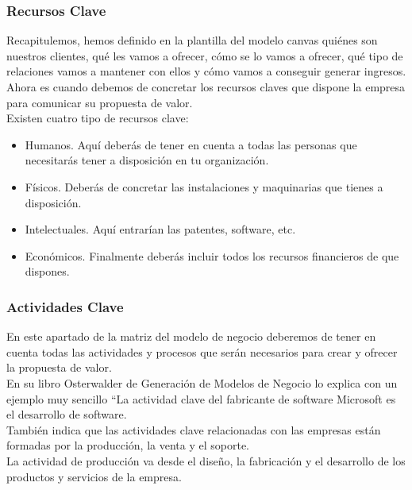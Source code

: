 \documentclass[preprint,12pt]{elsarticle}
\begin{document}
\subsubsection{Recursos Clave}

Recapitulemos, hemos definido en la plantilla del modelo canvas quiénes son nuestros clientes, qué les vamos a ofrecer, cómo se lo vamos a ofrecer, qué tipo de relaciones vamos a mantener con ellos y cómo vamos a conseguir generar ingresos.\\

Ahora es cuando debemos de concretar los recursos claves que dispone la empresa para comunicar su propuesta de valor.\\

 Existen cuatro tipo de recursos clave:\\
\begin{itemize}
\item Humanos. Aquí deberás de tener en cuenta a todas las personas que necesitarás tener a disposición en tu organización.
\item Físicos. Deberás de concretar las instalaciones y maquinarias que tienes a disposición.
\item Intelectuales. Aquí entrarían las patentes, software, etc.
\item Económicos. Finalmente deberás incluir todos los recursos financieros de que dispones.
\end{itemize}
\subsubsection{Actividades Clave}

En este apartado de la matriz del modelo de negocio deberemos de tener en cuenta todas las actividades y procesos que serán necesarios para crear y ofrecer la propuesta de valor.\\

En su libro Osterwalder de Generación de Modelos de Negocio lo explica con un ejemplo muy sencillo “La actividad clave del fabricante de software Microsoft es el desarrollo de software.\\

También indica que las actividades clave relacionadas con las empresas están formadas por la producción, la venta y el soporte.\\

La actividad de producción va desde el diseño, la fabricación y el desarrollo de los productos y servicios de la empresa.\\
\end{document}
